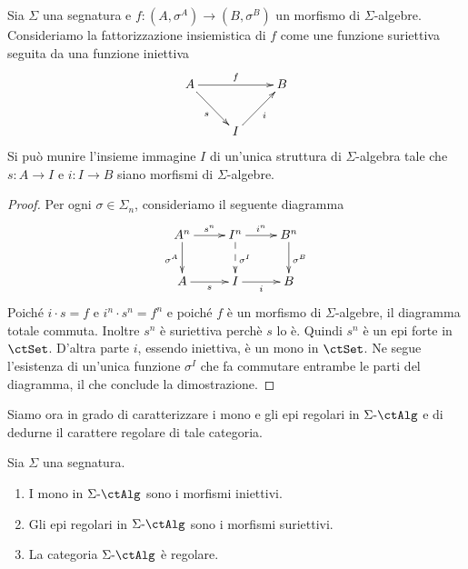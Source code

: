 \begin{lemma}\label{lemma_fatt_alg}
 Sia \(\Sigma\) una segnatura e \(f \colon (A,\sigma^A) \to (B, \sigma^B)\) un morfismo di \(\Sigma\)-algebre. Consideriamo
 la fattorizzazione insiemistica di \(f\) come une funzione suriettiva seguita da una funzione iniettiva
 \[\xymatrix{A \ar[rr]^-{f} \ar[rd]_{s} & & B \\ & I \ar[ru]_{i}}\]
 Si può munire l'insieme immagine \(I\) di un'unica struttura di \(\Sigma\)-algebra tale che \(s \colon A \to I\) e \(i \colon I \to B\)
 siano morfismi di \(\Sigma\)-algebre.
\end{lemma}

\begin{proof}
 Per ogni \(\sigma \in \Sigma_n\), consideriamo il seguente diagramma
 \[\xymatrix{A^n \ar[r]^-{s^n} \ar[d]_{\sigma^A} & I^n \ar[r]^-{i^n} \ar@{-->}[d]^{\sigma^I} & B^n \ar[d]^{\sigma^B} \\
  A \ar[r]_-{s} & I \ar[r]_-{i} & B}\]
 Poiché \(i \cdot s = f\) e \(i^n \cdot s^n = f^n\) e poiché \(f\) è un morfismo di \(\Sigma\)-algebre, il diagramma totale commuta.
 Inoltre \(s^n\) è suriettiva perchè \(s\) lo è. Quindi \(s^n\) è un epi forte in \(\ctSet\). D'altra parte \(i\), essendo iniettiva, è
 un mono in \(\ctSet\). Ne segue l'esistenza di un'unica funzione \(\sigma^I\) che fa commutare entrambe le parti del diagramma,
 il che conclude la dimostrazione.
\end{proof}

Siamo ora in grado di caratterizzare i mono e gli epi regolari in \(\ctSAlg\) e di dedurne il carattere regolare di tale categoria.

\begin{proposition}\label{prop_alg_reg}
 Sia \(\Sigma\) una segnatura.
 \begin{enumerate}
  \item I mono in \(\ctSAlg\) sono i morfismi iniettivi.
  \item Gli epi regolari in \(\ctSAlg\) sono i morfismi suriettivi.
  \item La categoria \(\ctSAlg\) è regolare.
 \end{enumerate}
\end{proposition}

